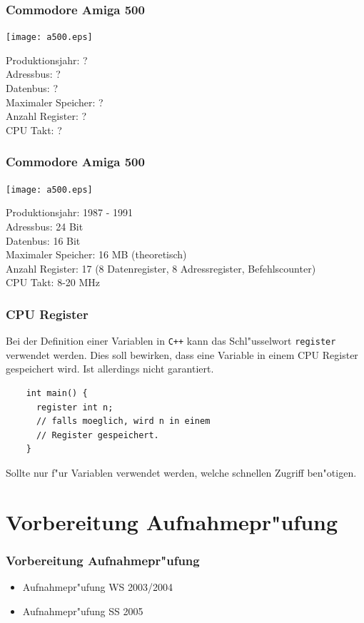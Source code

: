 \documentclass{beamer}
\begin{document}
\frame
{
	\frametitle{Commodore Amiga 500}
	\begin{multicols}{2}
	\texttt{[image: a500.eps]}

	\vspace{3mm}

	{\small
	Produktionsjahr: ?\\
	Adressbus: ?\\
	Datenbus: ?\\
	Maximaler Speicher: ?\\
	Anzahl Register: ?\\
	CPU Takt: ?
	}
	\end{multicols}
}

\frame
{
	\frametitle{Commodore Amiga 500}
	\begin{multicols}{2}
	\texttt{[image: a500.eps]}

	\vspace{3mm}

	{\small
	Produktionsjahr: 1987 - 1991\\
	Adressbus: 24 Bit\\
	Datenbus: 16 Bit\\
	Maximaler Speicher: 16 MB (theoretisch)\\
	Anzahl Register: 17 (8 Datenregister, 8 Adressregister, Befehlscounter)\\
	CPU Takt: 8-20 MHz
	}
	\end{multicols}
}

\begin{frame}[fragile]
	\frametitle{CPU Register}
	Bei der Definition einer Variablen in \verb|C++| kann das Schl"usselwort
	\verb|register| verwendet werden. Dies soll bewirken, dass eine Variable
	in einem CPU Register gespeichert wird. Ist allerdings nicht garantiert.

	\begin{lstlisting}
	int main() {
	  register int n;
	  // falls moeglich, wird n in einem
	  // Register gespeichert.
	}
	\end{lstlisting}
	
	Sollte nur f"ur Variablen verwendet werden, welche schnellen Zugriff ben"otigen.
\end{frame}

\section{Vorbereitung Aufnahmepr"ufung}
\frame
{
	\frametitle{Vorbereitung Aufnahmepr"ufung}
	\begin{itemize}
	\item Aufnahmepr"ufung WS 2003/2004
	\item Aufnahmepr"ufung SS 2005
	\end{itemize}
}
\end{document}
